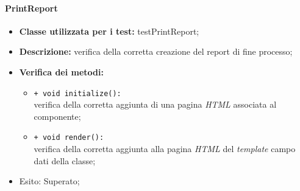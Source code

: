 \paragraph{PrintReport}
\begin{flushleft}
\begin{itemize}
\item \textbf{Classe utilizzata per i test:} testPrintReport;
\item \textbf{Descrizione:} verifica della corretta creazione del report di fine processo;
\item \textbf{Verifica dei metodi:}
\begin{sloppypar}
\begin{itemize}
\item \texttt{+ void initialize():}\\ verifica della corretta aggiunta di una pagina \textit{HTML} associata al componente;
\item \texttt{+ void render():}\\ verifica della corretta aggiunta alla pagina \textit{HTML} del \textit{template} campo dati della classe;
\end{itemize}
\end{sloppypar}
\item Esito: Superato;
\end{itemize}
\end{flushleft}

